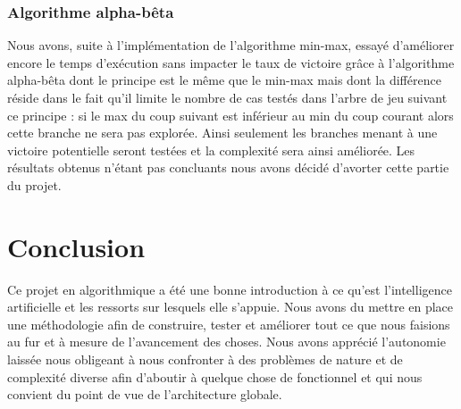 \documentclass{report}
\begin{document}
\subsection{Algorithme alpha-bêta}
Nous avons, suite à l'implémentation de l'algorithme min-max, essayé d'améliorer encore le temps d'exécution sans impacter le taux de victoire grâce à l'algorithme alpha-bêta dont le principe est le même que le min-max mais dont la différence réside dans le fait qu'il limite le nombre de cas testés dans l'arbre de jeu suivant ce principe : si le max du coup suivant est inférieur au min du coup courant alors cette branche ne sera pas explorée. Ainsi seulement les branches menant à une victoire potentielle seront testées et la complexité sera ainsi améliorée.
Les résultats obtenus n'étant pas concluants nous avons décidé d'avorter cette partie du projet. 


\chapter*{Conclusion}
Ce projet en algorithmique a été une bonne introduction à ce qu'est l'intelligence artificielle et les ressorts sur lesquels elle s'appuie.
Nous avons du mettre en place une méthodologie afin de construire, tester et améliorer tout ce que nous faisions au fur et à mesure de l'avancement des choses.
Nous avons apprécié l'autonomie laissée nous obligeant à nous confronter à des problèmes de nature et de complexité diverse afin d'aboutir à quelque chose de fonctionnel
et qui nous convient du point de vue de l'architecture globale.
\end{document}
